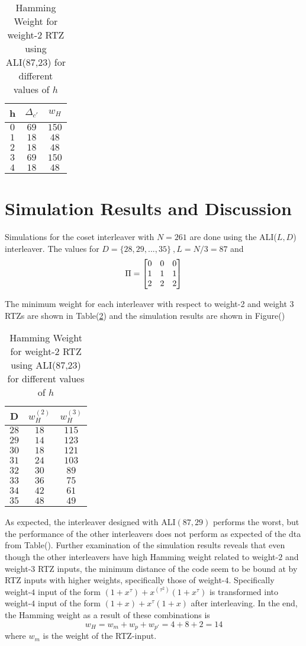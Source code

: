 \documentclass[11pt, oneside, dvipdfmx]{book}
\begin{document}
\begin{table}[h!]
\centering
\begin{tabular}{||c | c|c ||} 
 \hline
h &  $\Delta_{c'}$ &$w_H$\\
 \hline\hline
 $0$ &$69$& $150$\\
 \hline
 $1$ & $18$ & $48$\\
 \hline
 $2$ & $18$ & $48$\\
 \hline
 $3$ & $69$ & $150$\\
 \hline
$4$ & $18$ & $48$\\
 \hline\hline
\end{tabular}
\caption{Hamming Weight for weight-$2$ RTZ using ALI(87,23) for different values of $h$}
\label{tb5}
\end{table}

\section{Simulation Results and Discussion}
Simulations for the coset interleaver with $N=261$ are done using the ALI($L,D$) interleaver. The values for $D=\{28,29,...,35\}~,L=N/3 =87$ and $$\Pi =\begin{bmatrix} 0 & 0 & 0 \cr 1 & 1 & 1 \cr 2 & 2 & 2\end{bmatrix}$$

The minimum weight for each interleaver with respect to weight-2 and weight 3 RTZs are shown in Table(\ref{tb6}) and the simulation results are shown in Figure()
\begin{table}[h!]
\centering
\begin{tabular}{||c | c|c ||} 
 \hline
D &  $w_H^{(2)}$ &$w_H^{(3)}$\\
 \hline\hline
 $28$ &$18$& $115$\\
 \hline
 $29$ & $14$ & $123$\\
 \hline
 $30$ & $18$ & $121$\\
 \hline
 $31$ & $24$ & $103$\\
 \hline
$32$ & $30$ & $89$\\
 \hline
$33$ & $36$ & $75$\\
 \hline
$34$ & $42$ & $61$\\
 \hline
$35$ & $48$ & $49$\\
 \hline\hline
\end{tabular}
\caption{Hamming Weight for weight-$2$ RTZ using ALI(87,23) for different values of $h$}
\label{tb6}
\end{table}
As expected, the interleaver designed with ALI$(87,29)$ performs the worst, but the performance of the other interleavers does not perform as expected of the dta from Table(). Further examination of the simulation results reveals that even though the other interleavers have high Hamming weight related to weight-$2$ and weight-$3$ RTZ inputs, the minimum distance of the code seem to be bound at by RTZ inputs with higher weights, specifically those of weight-$4$. Specifically weight-$4$ input of the form $(1+x^{\tau}) +x^{(\tau^2)}(1+x^{\tau})$ is transformed into weight-$4$ input of the form $(1+x)+x^{\tau}(1+x)$ after interleaving. In the end, the Hamming weight as a result of these combinations is $$w_H=w_m+w_p+w_{p'}=4+8+2=14$$ where $w_m$ is the weight of the RTZ-input. 
\end{document}
